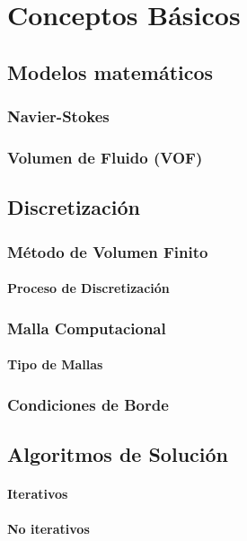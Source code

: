 \chapter{Conceptos Básicos}

\section{Modelos matemáticos}
	\subsection{Navier-Stokes}
	\subsection{Volumen de Fluido (VOF)}
	
\section{Discretización}
	\subsection{Método de Volumen Finito}
		\subsubsection{Proceso de Discretización}
	\subsection{Malla Computacional}
		\subsubsection{Tipo de Mallas}
	\subsection{Condiciones de Borde}
\section{Algoritmos de Solución}
	\subsubsection{Iterativos}
	\subsubsection{No iterativos}
